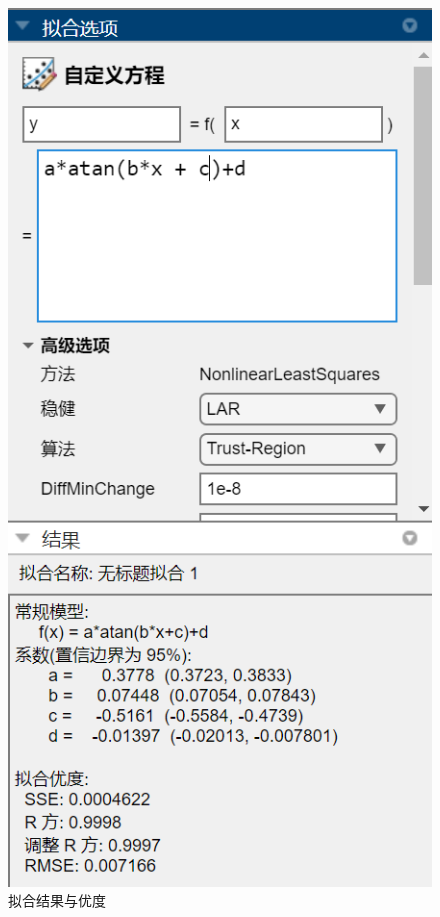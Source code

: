 \documentclass[UTF8]{article}
\theoremstyle{MyLineTheoremStyle} %
\theoremstyle{MyBlockTheoremStyle} %
\theoremstyle{MySubsubsectionStyle} %
\begin{document}
\begin{center}
\begin{minipage}{0.24\columnwidth}
\begin{figure}[H]
\includegraphics[width=\columnwidth]{assets/1.1/(1)/下半支.png}
\caption{拟合结果与优度}\label{1.1拟合优度}
\end{figure}
\end{minipage}
\end{center}
\end{document}
